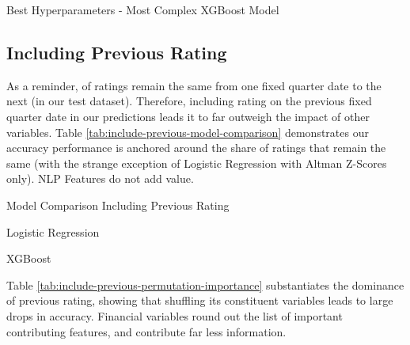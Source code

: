 \documentclass{article}[11pt]
\begin{document}
    \begin{table}[h!]
        \centering
        \caption{Best Hyperparameters - Most Complex XGBoost Model}
        
        \label{tab:xgboost-most-complex-best-params}
    \end{table}

    \clearpage
    \newpage

    \subsection{Including Previous Rating}

    \label{sec:include-previous-rating}

    As a reminder, \shareNotChanges \space of ratings remain the same from one fixed quarter date to the next (\shareNotChangesTest \space in our test dataset). Therefore, including rating on the previous fixed quarter date in our predictions leads it to far outweigh the impact of other variables. Table \ref{tab:include-previous-model-comparison} demonstrates our accuracy performance is anchored around the share of ratings that remain the same (with the strange exception of Logistic Regression with Altman Z-Scores only). NLP Features do not add value.

    \begin{table}[h!]
        \centering
        \caption{Model Comparison Including Previous Rating}
        \begin{minipage}[c]{0.495\linewidth}
            \centering
            
            \caption*{\footnotesize Logistic Regression} 
        \end{minipage}
        \begin{minipage}[c]{0.495\linewidth}
            \centering
            
            \caption*{\footnotesize XGBoost} 
        \end{minipage}
        \label{tab:include-previous-model-comparison}
    \end{table}

    Table \ref{tab:include-previous-permutation-importance} substantiates the dominance of previous rating, showing that shuffling its constituent variables leads to large drops in accuracy. Financial variables round out the list of important contributing features, and contribute far less information.
\end{document}
